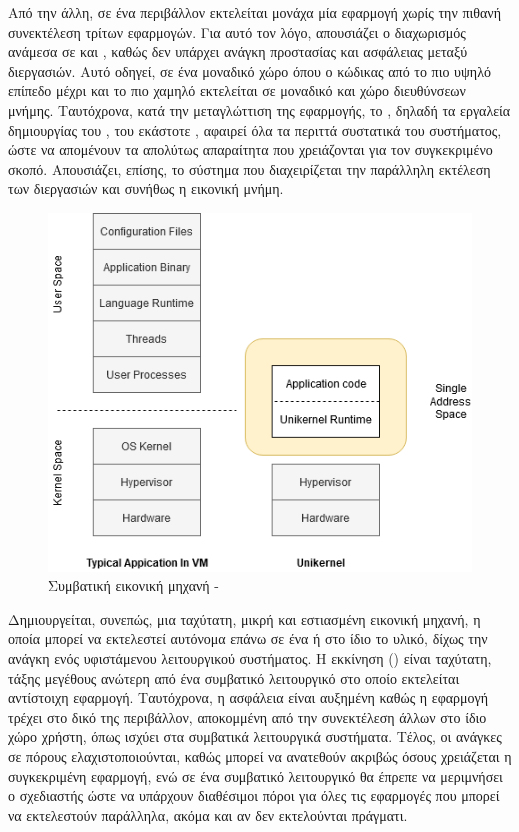 Από την άλλη, σε ένα  περιβάλλον εκτελείται μονάχα
μία εφαρμογή χωρίς την πιθανή συνεκτέλεση τρίτων εφαρμογών. Για αυτό τον
λόγο, απουσιάζει ο διαχωρισμός ανάμεσα σε  και
, καθώς δεν υπάρχει ανάγκη προστασίας και ασφάλειας
μεταξύ διεργασιών. Αυτό οδηγεί, σε ένα μοναδικό χώρο όπου ο
κώδικας από το πιο υψηλό επίπεδο μέχρι και το πιο χαμηλό
εκτελείται σε μοναδικό  και χώρο διευθύνσεων μνήμης.
Ταυτόχρονα, κατά την μεταγλώττιση της εφαρμογής, το , δηλαδή
τα εργαλεία δημιουργίας του , του εκάστοτε
, αφαιρεί όλα τα περιττά συστατικά του
συστήματος, ώστε να απομένουν τα απολύτως απαραίτητα που
χρειάζονται για τον συγκεκριμένο σκοπό. Απουσιάζει, επίσης, το
σύστημα που διαχειρίζεται την παράλληλη εκτέλεση των
διεργασιών και συνήθως η εικονική μνήμη\cite{libOSCloud}.
\newline

\begin{figure}[h]
  \includegraphics[width=\textwidth]{pictures/UnikernelDesign.png}
  \caption{Συμβατική εικονική μηχανή - }
  \label{fig:genUnikernel}
\end{figure}

Δημιουργείται, συνεπώς, μια ταχύτατη, μικρή και εστιασμένη
εικονική μηχανή, η οποία μπορεί να εκτελεστεί αυτόνομα
επάνω σε ένα  ή στο ίδιο το υλικό, δίχως την
ανάγκη ενός υφιστάμενου λειτουργικού συστήματος. Η εκκίνηση
() είναι ταχύτατη, τάξης μεγέθους ανώτερη από ένα
συμβατικό λειτουργικό στο οποίο εκτελείται αντίστοιχη
εφαρμογή. Ταυτόχρονα, η ασφάλεια είναι αυξημένη καθώς η
εφαρμογή τρέχει στο δικό της περιβάλλον, αποκομμένη από
την συνεκτέλεση άλλων στο ίδιο χώρο χρήστη, όπως ισχύει στα συμβατικά
λειτουργικά συστήματα. Τέλος, οι
ανάγκες σε πόρους ελαχιστοποιούνται, καθώς μπορεί να ανατεθούν
ακριβώς όσους χρειάζεται η συγκεκριμένη εφαρμογή,
ενώ σε ένα συμβατικό λειτουργικό θα έπρεπε να μεριμνήσει ο σχεδιαστής ώστε
να υπάρχουν διαθέσιμοι πόροι για όλες τις εφαρμογές που μπορεί
να εκτελεστούν παράλληλα, ακόμα και αν δεν εκτελούνται πράγματι.







